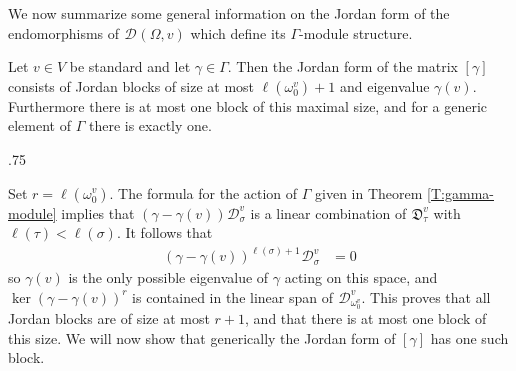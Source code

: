 \documentclass[11pt,fleqn]{amsart}
\makeatletter
\renewcommand\proofname{Proof}
\renewenvironment{proof}[1][\textit{\proofname}]{\par
 \pushQED{\qed}%
 \normalfont \topsep.75\paraskip\relax
 \trivlist
 \item[\hskip\labelsep
 \itshape
 #1\@addpunct{.}]\ignorespaces
}{%
 \popQED\endtrivlist\@endpefalse
}
\newcounter{para}[section]
\newcommand\D[3]{{}^{#1} \mathfrak D_{#2}^{#3}}
\newcommand\DD[3]{{}^{#1} \mathcal D_{#2}^{#3}}
\makeatother
\begin{document}
We now summarize some general information on the Jordan form of the 
endomorphisms of $\DD{}{}{}(\Omega, v)$ which define its $\Gamma$-module 
structure.
\begin{Theorem}
\label{T:jordan}
Let $v \in V$ be standard and let $\gamma \in \Gamma$. Then the Jordan form
of the matrix $[\gamma]$ consists of Jordan blocks of size at most 
$\ell(\omega_0^v)+1$ and eigenvalue $\gamma(v)$. Furthermore there is at most
one block of this maximal size, and for a generic element of $\Gamma$ there 
is exactly one. 
\end{Theorem}
\begin{proof}
Set $r = \ell(\omega_0^v)$.
The formula for the action of $\Gamma$ given in Theorem \ref{T:gamma-module}
implies that $(\gamma - \gamma(v)) \DD{}{\sigma}{v}$ is a linear combination of
$\D{}{\tau}{v}$ with $\ell(\tau) < \ell(\sigma)$. It follows that 
\begin{align*}
(\gamma - \gamma(v))^{\ell(\sigma) + 1} \DD{}{\sigma}{v} &= 0
\end{align*}
so $\gamma(v)$ is the only possible eigenvalue of $\gamma$ acting on this 
space, and $\ker (\gamma - \gamma(v))^{r}$ is contained 
in the linear span of $\DD{}{\omega_0^v}{v}$. This proves that all Jordan
blocks are of size at most $r+1$, and that there is at most one
block of this size. We will now show that generically the Jordan form of 
$[\gamma]$ has one such block.


\end{proof}
\end{document}
